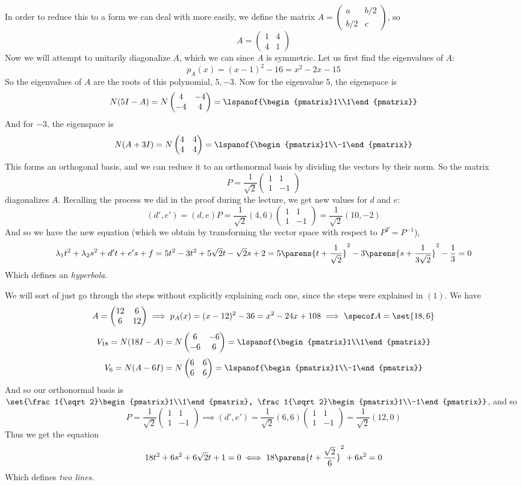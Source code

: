 \documentclass[10pt]{article}
\def\pmat#1{\begin{pmatrix} #1 \end{pmatrix}}
\def\pmat#1{\begin{pmatrix}#1\end{pmatrix}}
\begin{document}
    \benum
        \item In order to reduce this to a form we can deal with more easily, we define the matrix $A=\pmat{a&b/2\\b/2&c}$, so
            \[ A = \pmat{1 & 4 \\ 4 & 1} \]
            Now we will attempt to unitarily diagonalize $A$, which we can since $A$ is symmetric.
            Let us first find the eigenvalues of $A$:
            \[ p_A(x) = (x-1)^2-16 = x^2-2x-15 \]
            So the eigenvalues of $A$ are the roots of this polynomial, $5,-3$.
            Now for the eigenvalue $5$, the eigenspace is
            \[ N(5I-A) = N\pmat{4 & -4 \\ -4 & 4} = \lspanof{\pmat{1\\1}} \]
            And for $-3$, the eigenspace is
            \[ N(A+3I) = N\pmat{4 & 4 \\ 4 & 4} = \lspanof{\pmat{1\\-1}} \]
            This forms an orthogonal basis, and we can reduce it to an orthonormal basis by dividing the vectors by their norm.
            So the matrix
            \[ P = \frac1{\sqrt2}\pmat{1 & 1 \\ 1 & -1} \]
            diagonalizes $A$.
            Recalling the process we did in the proof during the lecture, we get new values for $d$ and $e$:
            \[ (d',e') = (d,e)P = \frac1{\sqrt2}(4,6)\pmat{1 & 1 \\ 1 & -1} = \frac1{\sqrt2}(10,-2) \]
            And so we have the new equation (which we obtain by transforming the vector space with respect to $P^T=P^{-1}$),
            \[ \lambda_1t^2 + \lambda_2s^2 + d't + e's + f = 5t^2 - 3t^2 + 5\sqrt2t - \sqrt2s + 2 = 5\parens{t+\frac1{\sqrt2}}^2 - 3\parens{s+\frac1{3\sqrt2}}^2 - \frac13 = 0 \]
            Which defines an \emph{hyperbola}.

        \item We will sort of just go through the steps without explicitly explaining each one, since the steps were explained in $(1)$.
            We have
            \[ A = \pmat{12 & 6 \\ 6 & 12} \implies p_A(x) = (x-12)^2 - 36 = x^2 - 24x + 108 \implies \specof A = \set{18, 6} \]
            \[ V_{18} = N(18I-A) = N\pmat{6 & -6 \\ -6 & 6} = \lspanof{\pmat{1\\1}} \]
            \[ V_6 = N(A-6I) = N\pmat{6 & 6 \\ 6 & 6} = \lspanof{\pmat{1\\-1}} \]
            And so our orthonormal basis is $\set{\frac1{\sqrt2}\pmat{1\\1}, \frac1{\sqrt2}\pmat{1\\-1}}$, and so
            \[ P = \frac1{\sqrt2}\pmat{1 & 1 \\ 1 & -1} \implies (d', e') = \frac1{\sqrt2}(6,6)\pmat{1 & 1 \\ 1 & -1} = \frac1{\sqrt2}(12, 0) \]
            Thus we get the equation
            \[ 18t^2 + 6s^2 + 6\sqrt2t + 1 = 0 \iff 18\parens{t+\frac{\sqrt2}6}^2 + 6s^2 = 0 \]
            Which defines \emph{two lines}.
\end{document}
